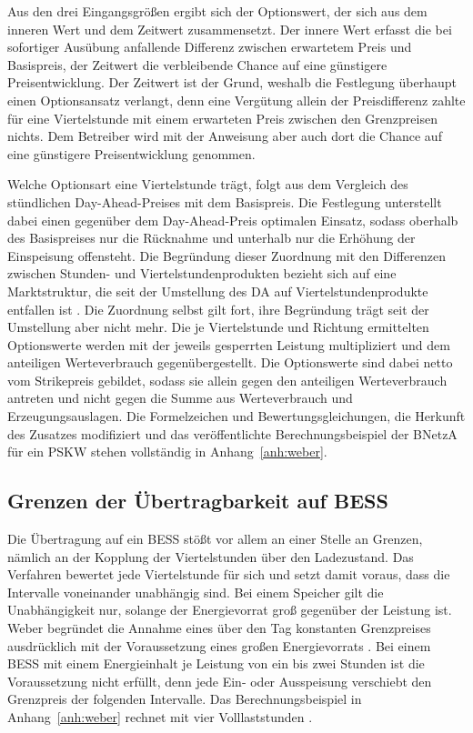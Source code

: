 Aus den drei Eingangsgrößen ergibt sich der Optionswert, der sich aus dem inneren Wert und dem Zeitwert zusammensetzt.
Der innere Wert erfasst die bei sofortiger Ausübung anfallende Differenz zwischen erwartetem Preis und Basispreis, der Zeitwert die verbleibende Chance auf eine günstigere Preisentwicklung.
Der Zeitwert ist der Grund, weshalb die Festlegung überhaupt einen Optionsansatz verlangt, denn eine Vergütung allein der Preisdifferenz zahlte für eine Viertelstunde mit einem erwarteten Preis zwischen den Grenzpreisen nichts.
Dem Betreiber wird mit der Anweisung aber auch dort die Chance auf eine günstigere Preisentwicklung genommen.

Welche Optionsart eine Viertelstunde trägt, folgt aus dem Vergleich des stündlichen Day-Ahead-Preises mit dem Basispreis.
Die Festlegung unterstellt dabei einen gegenüber dem Day-Ahead-Preis optimalen Einsatz, sodass oberhalb des Basispreises nur die Rücknahme und unterhalb nur die Erhöhung der Einspeisung offensteht.
Die Begründung dieser Zuordnung mit den Differenzen zwischen Stunden- und Viertelstundenprodukten bezieht sich auf eine Marktstruktur, die seit der Umstellung des \ac{DA} auf Viertelstundenprodukte entfallen ist \cite{ffe_saegezahn_2026}.
Die Zuordnung selbst gilt fort, ihre Begründung trägt seit der Umstellung aber nicht mehr.
Die je Viertelstunde und Richtung ermittelten Optionswerte werden mit der jeweils gesperrten Leistung multipliziert und dem anteiligen Werteverbrauch gegenübergestellt.
Die Optionswerte sind dabei netto vom Strikepreis gebildet, sodass sie allein gegen den anteiligen Werteverbrauch antreten und nicht gegen die Summe aus Werteverbrauch und Erzeugungsauslagen.
Die Formelzeichen und Bewertungsgleichungen, die Herkunft des Zusatzes modifiziert und das veröffentlichte Berechnungsbeispiel der \ac{BNetzA} für ein \ac{PSKW} stehen vollständig in Anhang~\ref{anh:weber}.

\subsection{Grenzen der Übertragbarkeit auf \acs{BESS}}
\label{sec:weber_limits}

Die Übertragung auf ein \ac{BESS} stößt vor allem an einer Stelle an Grenzen, nämlich an der Kopplung der Viertelstunden über den Ladezustand.
Das Verfahren bewertet jede Viertelstunde für sich und setzt damit voraus, dass die Intervalle voneinander unabhängig sind.
Bei einem Speicher gilt die Unabhängigkeit nur, solange der Energievorrat groß gegenüber der Leistung ist.
Weber begründet die Annahme eines über den Tag konstanten Grenzpreises ausdrücklich mit der Voraussetzung eines großen Energievorrats \cite{weber_gutachten_2015}.
Bei einem \ac{BESS} mit einem Energieinhalt je Leistung von ein bis zwei Stunden ist die Voraussetzung nicht erfüllt, denn jede Ein- oder Ausspeisung verschiebt den Grenzpreis der folgenden Intervalle.
Das Berechnungsbeispiel in Anhang~\ref{anh:weber} rechnet mit vier Volllaststunden \cite{bundesnetzagentur_berechnungsbeispiel_2024}.

